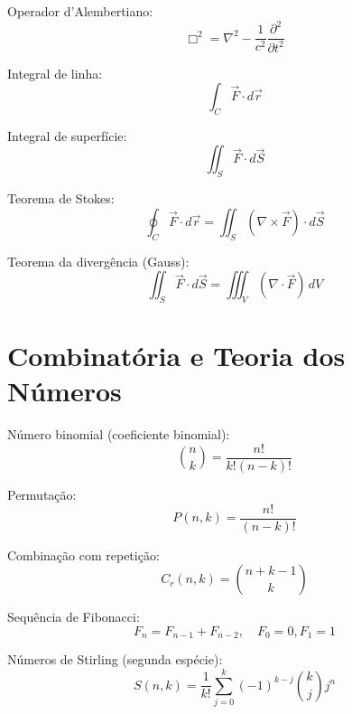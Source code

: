 Operador d'Alembertiano:
\begin{equation}
\Box^2 = \nabla^2 - \frac{1}{c^2}\frac{\partial^2}{\partial t^2}
\end{equation}

Integral de linha:
\begin{equation}
\int_C \vec{F} \cdot d\vec{r}
\end{equation}

Integral de superfície:
\begin{equation}
\iint_S \vec{F} \cdot d\vec{S}
\end{equation}

Teorema de Stokes:
\begin{equation}
\oint_C \vec{F} \cdot d\vec{r} = \iint_S (\nabla \times \vec{F}) \cdot d\vec{S}
\end{equation}

Teorema da divergência (Gauss):
\begin{equation}
\iint_S \vec{F} \cdot d\vec{S} = \iiint_V (\nabla \cdot \vec{F})\,dV
\end{equation}


\section{Combinatória e Teoria dos Números}

Número binomial (coeficiente binomial):
\begin{equation}
\binom{n}{k} = \frac{n!}{k!(n-k)!}
\end{equation}

Permutação:
\begin{equation}
P(n,k) = \frac{n!}{(n-k)!}
\end{equation}

Combinação com repetição:
\begin{equation}
C_r(n,k) = \binom{n+k-1}{k}
\end{equation}

Sequência de Fibonacci:
\begin{equation}
F_n = F_{n-1} + F_{n-2}, \quad F_0 = 0, F_1 = 1
\end{equation}

Números de Stirling (segunda espécie):
\begin{equation}
S(n,k) = \frac{1}{k!}\sum_{j=0}^{k}(-1)^{k-j}\binom{k}{j}j^n
\end{equation}

